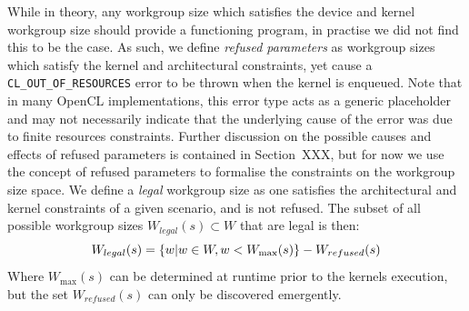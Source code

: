\documentclass[nonatbib,preprint,10pt]{sigplanconf}
\begin{document}
While in theory, any workgroup size which satisfies the device and
kernel workgroup size should provide a functioning program, in
practise we did not find this to be the case. As such, we define
\emph{refused parameters} as workgroup sizes which satisfy the kernel
and architectural constraints, yet cause a
\texttt{CL\_OUT\_OF\_RESOURCES} error to be thrown when the kernel is
enqueued. Note that in many OpenCL implementations, this error type
acts as a generic placeholder and may not necessarily indicate that
the underlying cause of the error was due to finite resources
constraints. Further discussion on the possible causes and effects of
refused parameters is contained in Section~XXX, but for now we use the
concept of refused parameters to formalise the constraints on the
workgroup size space. We define a \emph{legal} workgroup size as one
satisfies the architectural and kernel constraints of a given
scenario, and is not refused. The subset of all possible workgroup
sizes $W_{legal}(s) \subset W$ that are legal is then:
%
\begin{equation}
  \footnotesize
  W_{legal}(s) = \left\{w | w \in W, w < W_{\max}(s) \right\} - W_{refused}(s)
\end{equation}
%
Where $W_{\max}(s)$ can be determined at runtime prior to the kernels
execution, but the set $W_{refused}(s)$ can only be discovered
emergently.


%
\end{document}
